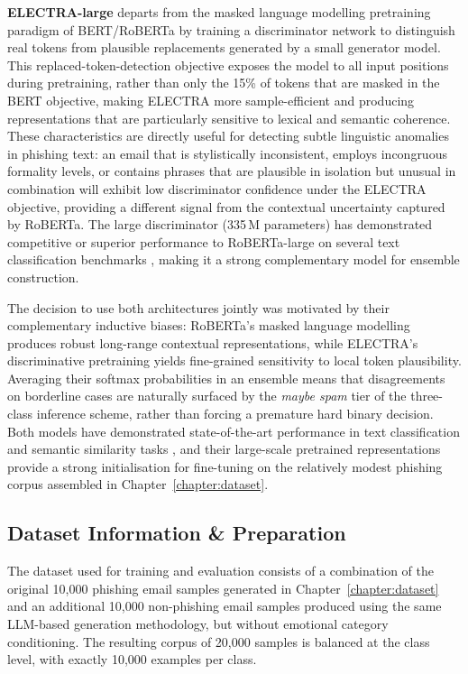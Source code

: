 \textbf{\acs{ELECTRA}-large} departs from the masked language modelling pretraining paradigm of BERT/RoBERTa by training a discriminator network to distinguish real tokens from plausible replacements generated by a small generator model. This replaced-token-detection objective exposes the model to all input positions during pretraining, rather than only the 15\% of tokens that are masked in the BERT objective, making ELECTRA more sample-efficient and producing representations that are particularly sensitive to lexical and semantic coherence. These characteristics are directly useful for detecting subtle linguistic anomalies in phishing text: an email that is stylistically inconsistent, employs incongruous formality levels, or contains phrases that are plausible in isolation but unusual in combination will exhibit low discriminator confidence under the ELECTRA objective, providing a different signal from the contextual uncertainty captured by RoBERTa. The large discriminator (335\,M parameters) has demonstrated competitive or superior performance to RoBERTa-large on several text classification benchmarks \cite{clark2020electra}, making it a strong complementary model for ensemble construction.

The decision to use both architectures jointly was motivated by their complementary inductive biases: RoBERTa's masked language modelling produces robust long-range contextual representations, while ELECTRA's discriminative pretraining yields fine-grained sensitivity to local token plausibility. Averaging their softmax probabilities in an ensemble means that disagreements on borderline cases are naturally surfaced by the \textit{maybe spam} tier of the three-class inference scheme, rather than forcing a premature hard binary decision. Both models have demonstrated state-of-the-art performance in text classification and semantic similarity tasks \cite{liu2019roberta, sanh2019distilbert}, and their large-scale pretrained representations provide a strong initialisation for fine-tuning on the relatively modest phishing corpus assembled in Chapter~\ref{chapter:dataset}.

\subsection{Dataset Information \& Preparation}

The dataset used for training and evaluation consists of a combination of the original 10,000 phishing email samples generated in Chapter~\ref{chapter:dataset} and an additional 10,000 non-phishing email samples produced using the same LLM-based generation methodology, but without emotional category conditioning. The resulting corpus of 20,000 samples is balanced at the class level, with exactly 10,000 examples per class.

